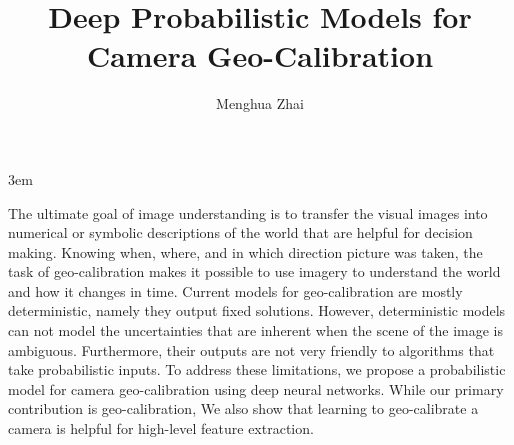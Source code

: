 \documentclass[final]{ukthesis}
\begin{document}
\emergencystretch 3em

\author{Menghua Zhai}
\title{Deep Probabilistic Models for Camera Geo-Calibration}

\abstract
{ \SingleSpacing
The ultimate goal of image understanding is to transfer the visual
images into numerical or symbolic descriptions of the world
that are helpful for decision making.
%
%
Knowing when, where, and in which direction picture was taken, the
task of geo-calibration makes it possible to use imagery to understand
the world and how it changes in time. Current models for
geo-calibration are mostly deterministic, namely they output fixed
solutions. However, deterministic models can not model the
uncertainties that are inherent when the scene of the image is ambiguous.
Furthermore, their outputs are not very friendly to algorithms that
take probabilistic inputs. To address these limitations, we
propose a probabilistic model for camera geo-calibration using deep
neural networks.
%
While our primary contribution is geo-calibration, We also show that
learning to geo-calibrate a camera is helpful for high-level feature
extraction.
%
}


\frontmatter
\maketitle



\tableofcontents\clearpage

\mainmatter




\backmatter




\end{document}
